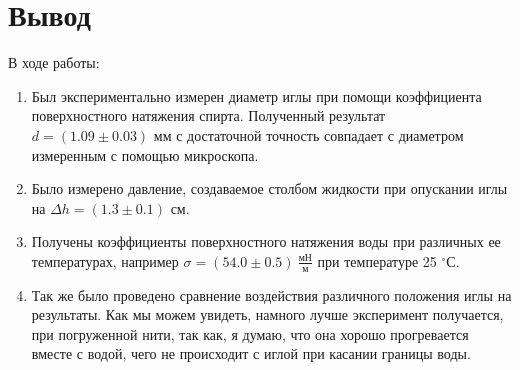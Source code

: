 \documentclass[a4paper,12pt]{article}
\theoremstyle{definition}
\begin{document}
	\section{Вывод}
	В ходе работы:
	\begin{enumerate}
		\item Был экспериментально измерен диаметр иглы при помощи коэффициента поверхностного натяжения спирта. Полученный результат $d = (1.09\pm 0.03)\text{ мм}$ с достаточной точность совпадает с диаметром измеренным с помощью микроскопа.
		\item Было измерено давление, создаваемое столбом жидкости при опускании иглы на $\Delta h = (1.3\pm 0.1)$ см.
		\item Получены коэффициенты поверхностного натяжения воды при различных ее температурах, например $\sigma = (54.0\pm 0.5)\:\frac{\text{мН}}{\text{м}}$ при температуре 25 $^\circ$С.
		\item Так же было проведено сравнение воздействия различного положения иглы на результаты. Как мы можем увидеть, намного лучше эксперимент получается, при погруженной нити, так как, я думаю, что она хорошо прогревается вместе с водой, чего не происходит с иглой при касании границы воды.
	\end{enumerate}
	
	
	
	
	
	
	
\end{document}
